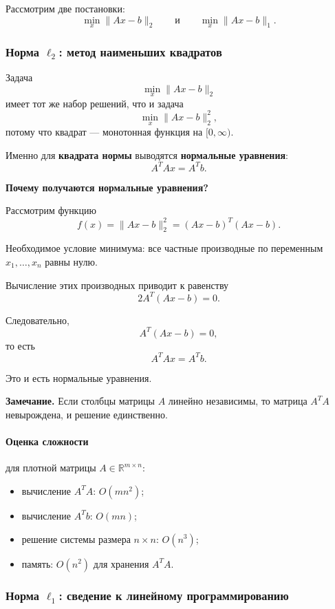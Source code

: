 	Рассмотрим две постановки:
	\[
	\min_x \|Ax-b\|_2
	\qquad \text{и} \qquad
	\min_x \|Ax-b\|_1.
	\]
	
	\subsubsection*{Норма \texorpdfstring{$\ell_2$}{l2}: метод наименьших квадратов}
	
	Задача
	\[
	\min_x \|Ax-b\|_2
	\]
	имеет тот же набор решений, что и задача
	\[
	\min_x \|Ax-b\|_2^2,
	\]
	потому что квадрат --- монотонная функция на \([0,\infty)\).
	
	Именно для \textbf{квадрата нормы} выводятся \textbf{нормальные уравнения}:
	\[
	A^T A x = A^T b.
	\]
	
	\textbf{Почему получаются нормальные уравнения?}
	
	Рассмотрим функцию
	\[
	f(x)=\|Ax-b\|_2^2=(Ax-b)^T(Ax-b).
	\]
	
	Необходимое условие минимума: все частные производные по переменным
	\(x_1,\dots,x_n\) равны нулю.
	
	Вычисление этих производных приводит к равенству
	\[
	2A^T(Ax-b)=0.
	\]
	
	Следовательно,
	\[
	A^T(Ax-b)=0,
	\]
	то есть
	\[
	A^TAx=A^Tb.
	\]
	
	Это и есть нормальные уравнения.
	
	\medskip
	
	\textbf{Замечание.} Если столбцы матрицы \(A\) линейно независимы, то матрица \(A^T A\) невырождена, и решение единственно.
	
	\paragraph{Оценка сложности} для плотной матрицы \(A \in \mathbb{R}^{m\times n}\):
	\begin{itemize}
		\item вычисление \(A^T A\): \(O(mn^2)\);
		\item вычисление \(A^T b\): \(O(mn)\);
		\item решение системы размера \(n\times n\): \(O(n^3)\);
		\item память: \(O(n^2)\) для хранения \(A^T A\).
	\end{itemize}
	
	\subsubsection*{Норма \texorpdfstring{$\ell_1$}{l1}: сведение к линейному программированию}
	
